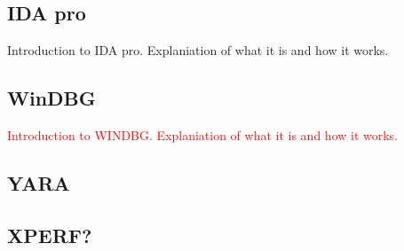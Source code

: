 \subsection{IDA pro}
Introduction to IDA pro. Explaniation of what it is and how it works.
\subsection{WinDBG}
\textcolor{red}{Introduction to WINDBG. Explaniation of what it is and how it works.}
\subsection{YARA}
\subsection{XPERF? }
